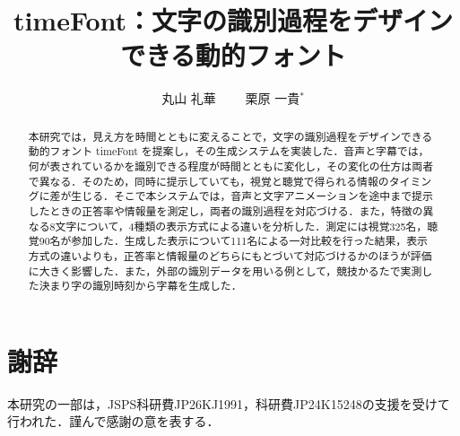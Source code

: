 




\title{timeFont：文字の識別過程をデザインできる動的フォント}
\etitle{}
\author{丸山 礼華 　　栗原 一貴${}^*$}

\begin{abstract}
本研究では，見え方を時間とともに変えることで，文字の識別過程をデザインできる動的フォント timeFont を提案し，その生成システムを実装した．音声と字幕では，何が表されているかを識別できる程度が時間とともに変化し，その変化の仕方は両者で異なる．そのため，同時に提示していても，視覚と聴覚で得られる情報のタイミングに差が生じる．そこで本システムでは，音声と文字アニメーションを途中まで提示したときの正答率や情報量を測定し，両者の識別過程を対応づける．また，特徴の異なる8文字について，4種類の表示方式による違いを分析した．測定には視覚325名，聴覚90名が参加した．生成した表示について111名による一対比較を行った結果，表示方式の違いよりも，正答率と情報量のどちらにもとづいて対応づけるかのほうが評価に大きく影響した．また，外部の識別データを用いる例として，競技かるたで実測した決まり字の識別時刻から字幕を生成した．
\end{abstract}

\maketitle



\section*{謝辞}
本研究の一部は，JSPS科研費JP26KJ1991，科研費JP24K15248の支援を受けて行われた．謹んで感謝の意を表する．



\clearpage
\mbox{}   %

